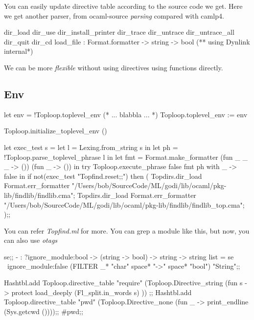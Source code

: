 You can easily update directive table according to the source code we
get. Here we get another parser, from ocaml-source \textit{parsing}
compared with camlp4.

\begin{ocamlcode}
  dir_load
  dir_use
  dir_install_printer
  dir_trace
  dir_untrace
  dir_untrace_all
  dir_quit
  dir_cd 
  load_file : Format.formatter -> string -> bool  (** using Dynlink internal*)
\end{ocamlcode}
We can be more \textit{flexible} without using directives using functions directly.


\subsection{Env}

  \begin{ocamlcode}
    let env = !Toploop.toplevel_env
    (* ... blabbla ...     *)
    Toploop.toplevel_env := env  
  \end{ocamlcode}
  
  \begin{ocamlcode}
    Toploop.initialize_toplevel_env ()  
  \end{ocamlcode}


\begin{ocamlcode}
let exec_test s =
  let l = Lexing.from_string s in
  let ph = !Toploop.parse_toplevel_phrase l in
  let fmt = Format.make_formatter (fun _ _ _ -> ()) (fun _ -> ()) in
  try
    Toploop.execute_phrase false fmt ph
  with
      _ -> false
in
if not(exec_test "Topfind.reset;;") then (
  Topdirs.dir_load Format.err_formatter "/Users/bob/SourceCode/ML/godi/lib/ocaml/pkg-lib/findlib/findlib.cma";
  Topdirs.dir_load Format.err_formatter "/Users/bob/SourceCode/ML/godi/lib/ocaml/pkg-lib/findlib/findlib_top.cma";
);;
\end{ocamlcode}
    
You can refer \textit{Topfind.ml} for more. You can grep a module like
this, but now, you can also use \textit{otags}

\begin{ocamlcode}
se;;
- : ?ignore_module:bool -> (string -> bool) -> string -> string list =
se ~ignore_module:false (FILTER _*  "char" space* "->" space* "bool") "String";;
\end{ocamlcode}

\begin{ocamlcode}
Hashtbl.add
    Toploop.directive_table
    "require"
    (Toploop.Directive_string
       (fun s ->
	  protect load_deeply (Fl_split.in_words s)
       ))
;;
Hashtbl.add Toploop.directive_table "pwd"
(Toploop.Directive_none (fun _ -> 
  print_endline (Sys.getcwd ())));;
#pwd;;
\end{ocamlcode}





